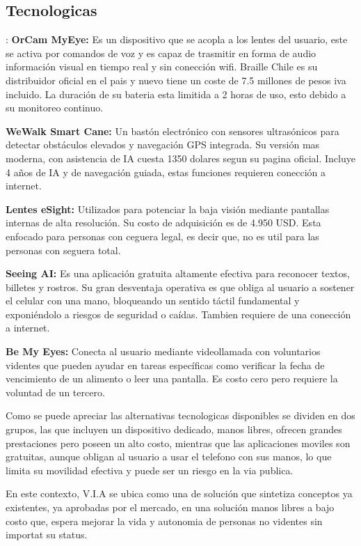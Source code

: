 \documentclass{article}
\begin{document}
        \subsection{Tecnologicas}:
            \textbf{OrCam MyEye:} Es un dispositivo que se acopla a los lentes del usuario, este se activa por comandos de voz y es capaz de trasmitir en forma de audio información visual en tiempo real y sin conección wifi. Braille Chile es su distribuidor oficial en el pais y nuevo tiene un coste de 7.5 millones de pesos iva incluido.
            La duración de su bateria esta limitida a 2 horas de uso, esto debido a su monitoreo continuo.

            \textbf{WeWalk Smart Cane:} Un bastón electrónico con sensores ultrasónicos para detectar obstáculos elevados y navegación GPS integrada. Su versión mas moderna, con asistencia de IA cuesta 1350 dolares segun su pagina oficial. Incluye 4 años de IA y de navegación guiada, estas funciones requieren conección a internet.

            \textbf{Lentes eSight:} Utilizados para potenciar la baja visión mediante pantallas internas de alta resolución. Su costo de adquisición es de 4.950 USD\@. Esta enfocado para personas con ceguera legal, es decir que, no es util para las personas con seguera total.

            \textbf{Seeing AI:} Es una aplicación gratuita altamente efectiva para reconocer textos, billetes y rostros. Su gran desventaja operativa es que obliga al usuario a sostener el celular con una mano, bloqueando un sentido táctil fundamental y exponiéndolo a riesgos de seguridad o caídas. Tambien requiere de una conección a internet.

            \textbf{Be My Eyes:} Conecta al usuario mediante videollamada con voluntarios videntes que pueden ayudar en tareas específicas como verificar la fecha de vencimiento de un alimento o leer una pantalla. Es costo cero pero requiere la voluntad de un tercero.

        Como se puede apreciar las alternativas tecnologicas disponibles se dividen en dos grupos, las que incluyen un dispositivo dedicado, manos libres, ofrecen grandes prestaciones pero poseen un alto costo, mientras que las aplicaciones moviles son gratuitas, aunque obligan al usuario a usar el telefono con sus manos, lo que limita su movilidad efectiva y puede ser un riesgo en la via publica.

        En este contexto, V.I.A se ubica como una de solución que sintetiza conceptos ya existentes, ya aprobadas por el mercado, en una solución manos libres a bajo costo que, espera mejorar la vida y autonomia de personas no videntes sin importat su status.
\end{document}

